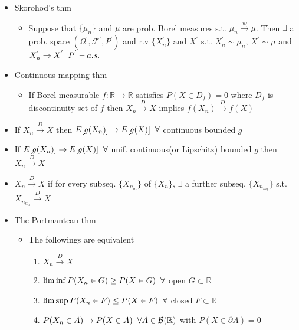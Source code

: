 \documentclass[12pt, A4]{article}
\begin{document}
\begin{itemize}
\begin{itemize}
	\end{itemize}
	\item Skorohod's thm
	\begin{itemize}
		\item Suppose that $\{\mu_n\}$ and $\mu$ are prob. Borel measures s.t. $\mu_n \xrightarrow{w} \mu$. Then $\exists$ a prob. space $(\Omega^{'}, \mathcal{F}^{'}, P^{'})$ and r.v $\{X_n^{'}\}$ and $X^{'}$ s.t. $X_n^{'}\sim \mu_n$, $X^{'}\sim \mu$ and $X_n^{'}\rightarrow X^{'} \hspace{0.2cm} P^{'}-a.s.$ 
	\end{itemize}
	\item Continuous mapping thm
	\begin{itemize}
		\item If Borel measurable $f : \mathbb{R}\rightarrow \mathbb{R}$ satisfies $P(X\in D_f)=0$ where $D_f$ is discontinuity set of $f$ then $X_n \xrightarrow{D} X$ implies $f(X_n)\xrightarrow{D} f(X)$ 
	\end{itemize}
	\item If $X_n\xrightarrow{D} X$ then $E[g(X_n)]\rightarrow E[g(X)] \hspace{0.2cm} \forall$ continuous bounded $g$
	\item If $E[g(X_n)]\rightarrow E[g(X)] \hspace{0.2cm} \forall$ unif. continuous(or Lipschitz) bounded $g$ then $X_n\xrightarrow{D} X$
	\item $X_n\xrightarrow{D} X$ if for every subseq. $\{X_{n_m}\}$ of $\{X_n\}$, $\exists$ a further subseq. $\{X_{n_{m_k}}\}$ s.t.  $X_{n_{m_k}}\xrightarrow{D} X$
	\item The Portmanteau thm
	\begin{itemize}
		\item The followings are equivalent
		\begin{enumerate}
			\item $X_n\xrightarrow{D} X$
			\item $\liminf P(X_n\in G)\geq P(X\in G) \hspace{0.2cm} \forall$ open $G\subset \mathbb{R}$
			\item $\limsup P(X_n\in F)\leq P(X\in F) \hspace{0.2cm} \forall$ closed $F\subset \mathbb{R}$
			\item $P(X_n\in A)\rightarrow P(X\in A) \hspace{0.2cm} \forall A\in \mathcal{B}(\mathbb{R})$ with $P(X\in \partial A)=0$
		\end{enumerate}
	\end{itemize}

\end{itemize}
\end{document}
